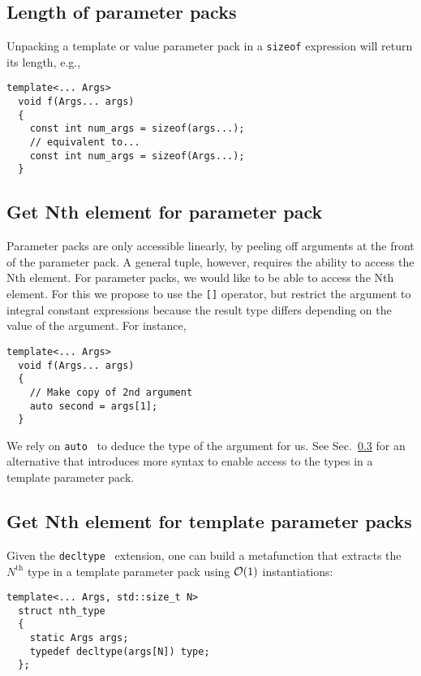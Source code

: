 \documentclass{article}
\begin{document}
\subsection{Length of parameter packs}
\label{sec:length-of-parameter-packs}
Unpacking a template or value parameter pack in a \texttt{sizeof}
expression will return its length, e.g.,

\begin{verbatim}
template<... Args>
  void f(Args... args)
  {
    const int num_args = sizeof(args...);
    // equivalent to...
    const int num_args = sizeof(Args...);
  }
\end{verbatim}

\subsection{Get Nth element for parameter pack}
Parameter packs are only accessible linearly, by peeling off arguments
at the front of the parameter pack. A general tuple, however, requires
the ability to access the Nth element. For parameter packs, we would
like to be able to access the Nth element. For this we propose to use
the \texttt{[]} operator, but restrict the argument to integral
constant expressions because the result type differs depending on the
value of the argument. For instance,

\begin{verbatim}
template<... Args>
  void f(Args... args)
  {
    // Make copy of 2nd argument
    auto second = args[1];
  }
\end{verbatim}

We rely on \texttt{auto}~\cite{JarviStroustrup04} to deduce the type
of the argument for us. See Sec.~\ref{sec:nth-element-template} for an
alternative that introduces more syntax to enable access to the types
in a template parameter pack.

\subsection{Get Nth element for template parameter packs}
\label{sec:nth-element-template}
Given the \texttt{decltype}~\cite{JarviStroustrup04} extension, one
can build a metafunction that extracts the $N^{\text{th}}$ type in a
template parameter pack using ${\cal O}(1)$ instantiations:

\begin{verbatim}
template<... Args, std::size_t N>
  struct nth_type
  {
    static Args args;
    typedef decltype(args[N]) type;
  };
\end{verbatim}
\end{document}
